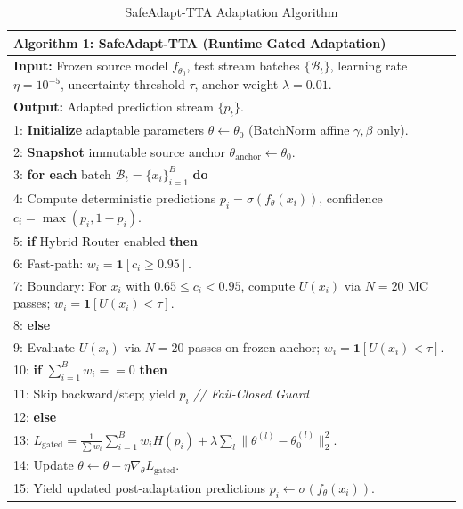\documentclass[conference]{IEEEtran}
\begin{document}
\begin{table}[t]
\caption{SafeAdapt-TTA Adaptation Algorithm}
\label{alg:safeadapt}
\centering
\scriptsize
\begin{tabular}{|p{}|}
\hline
\textbf{Algorithm 1: SafeAdapt-TTA (Runtime Gated Adaptation)} \\
\hline
\textbf{Input:} Frozen source model $f_{\theta_0}$, test stream batches $\{\mathcal{B}_t\}$, learning rate $\eta=10^{-5}$, uncertainty threshold $\tau$, anchor weight $\lambda=0.01$. \\
\textbf{Output:} Adapted prediction stream $\{p_t\}$. \\
1: \textbf{Initialize} adaptable parameters $\theta \leftarrow \theta_0$ (BatchNorm affine $\gamma, \beta$ only). \\
2: \textbf{Snapshot} immutable source anchor $\theta_{\text{anchor}} \leftarrow \theta_0$. \\
3: \textbf{for each} batch $\mathcal{B}_t = \{x_i\}_{i=1}^B$ \textbf{do} \\
4: \quad Compute deterministic predictions $p_i = \sigma(f_\theta(x_i))$, confidence $c_i = \max(p_i, 1-p_i)$. \\
5: \quad \textbf{if} Hybrid Router enabled \textbf{then} \\
6: \quad \quad Fast-path: $w_i = \mathbf{1}[c_i \ge 0.95]$. \\
7: \quad \quad Boundary: For $x_i$ with $0.65 \le c_i < 0.95$, compute $U(x_i)$ via $N{=}20$ MC passes; $w_i = \mathbf{1}[U(x_i) < \tau]$. \\
8: \quad \textbf{else} \\
9: \quad \quad Evaluate $U(x_i)$ via $N{=}20$ passes on frozen anchor; $w_i = \mathbf{1}[U(x_i) < \tau]$. \\
10: \quad \textbf{if} $\sum_{i=1}^B w_i == 0$ \textbf{then} \\
11: \quad \quad Skip backward/step; yield $p_i$ \quad \emph{// Fail-Closed Guard} \\
12: \quad \textbf{else} \\
13: \quad \quad $L_{\text{gated}} = \frac{1}{\sum w_i} \sum_{i=1}^B w_i H(p_i) + \lambda \sum_l \|\theta^{(l)} - \theta_0^{(l)}\|_2^2$. \\
14: \quad \quad Update $\theta \leftarrow \theta - \eta \nabla_\theta L_{\text{gated}}$. \\
15: \quad \quad Yield updated post-adaptation predictions $p_i \leftarrow \sigma(f_\theta(x_i))$. \\
\hline
\end{tabular}
\end{table}
\end{document}
